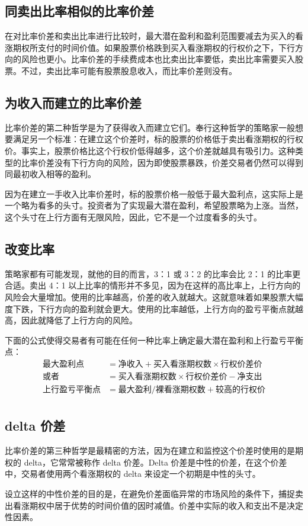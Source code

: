 \subsection{同卖出比率相似的比率价差}
在对比率价差和卖出比率进行比较时，最大潜在盈利和盈利范围要减去为买入的看涨期权所支付的时间价值。如果股票价格跌到买入看涨期权的行权价之下，下行方向的风险也更小。比率价差的手续费成本也比卖出比率要低，卖出比率需要买入股票。不过，卖出比率可能有股票股息收入，而比率价差则没有。
\subsection{为收入而建立的比率价差}
比率价差的第二种哲学是为了获得收入而建立它们。奉行这种哲学的策略家一般想要满足另一个标准：在建立这个价差时，标的股票的价格低于卖出看涨期权的行权价。事实上，股票价格比这个行权价低得越多，这个价差就越具有吸引力。这种类型的比率价差没有下行方向的风险，因为即使股票暴跌，价差交易者仍然可以得到同最初收入相等的盈利。

因为在建立一手收入比率价差时，标的股票价格一般低于最大盈利点，这实际上是一个略为看多的头寸。投资者为了实现最大潜在盈利，希望股票略为上涨。当然，这个头寸在上行方面有无限风险，因此，它不是一个过度看多的头寸。
\subsection{改变比率}
策略家都有可能发现，就他的目的而言，3：1 或 3：2 的比率会比 2：1 的比率更合适。卖出 4：1 以上比率的情形并不多见，因为在这样的高比率上，上行方向的风险会大量增加。使用的比率越高，价差的收入就越大。这就意味着如果股票大幅度下跌，下行方向的盈利就会更大。使用的比率越低，上行方向的盈亏平衡点就越高，因此就降低了上行方向的风险。

下面的公式使得交易者有可能在任何一种比率上确定最大潜在盈利和上行盈亏平衡点：
\begin{equation}
    \begin{aligned}
        \text{最大盈利点}   & =\text{净收入}+\text{买入看涨期权数}\times \text{行权价差价} \\
        \text{或者}      & =\text{买入看涨期权数}\times \text{行权价差价}-\text{净支出} \\
        \text{上行盈亏平衡点} & =\text{最大盈利}/\text{裸看涨期权数}+\text{较高的行权价}      \\
    \end{aligned}
\end{equation}
\subsection{delta 价差}
比率价差的第三种哲学是最精密的方法，因为在建立和监控这个价差时使用的是期权的 delta，它常常被称作 delta 价差。Delta 价差是中性的价差，在这个价差中，交易者使用两个看涨期权的 delta 来设定一个初期是中性的头寸。
\begin{tcolorbox}
    设立这样的中性价差的目的是，在避免价差面临异常的市场风险的条件下，捕捉卖出看涨期权中居于优势的时间价值的因时减值。价差中实际的收入和支出不是决定性因素。
\end{tcolorbox}

